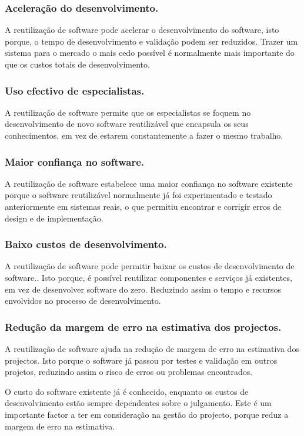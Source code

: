\documentclass[runningheads]{llncs}
\begin{document}
\subsubsection{Aceleração do desenvolvimento.}

A reutilização de software pode acelerar o desenvolvimento do software, isto porque, o tempo de desenvolvimento e validação podem ser reduzidos. Trazer um sistema para o mercado o mais cedo possível é normalmente mais importante do que os custos totais de desenvolvimento.

\subsubsection{Uso efectivo de especialistas.}

A reutilização de software permite que os especialistas se foquem no desenvolvimento de novo software reutilizável que encapsula os seus conhecimentos, em vez de estarem constantemente a fazer o mesmo trabalho.

\subsubsection{Maior confiança no software.}

A reutilização de software estabelece uma maior confiança no software existente porque o software reutilizável normalmente já foi experimentado e testado anteriormente em sistemas reais, o que permitiu encontrar e corrigir erros de design e de implementação.

\subsubsection{Baixo custos de desenvolvimento.}

A reutilização de software pode permitir baixar os custos de desenvolvimento de software.. Isto porque, é possível reutilizar componentes e serviços já existentes, em vez de desenvolver software do zero. Reduzindo assim o tempo e recursos envolvidos no processo de desenvolvimento.  


\subsubsection{Redução da margem de erro na estimativa dos projectos.}

A reutilização de software ajuda na redução de margem de erro na estimativa dos projectos. Isto porque o software já passou por testes e validação em outros projetos, reduzindo assim o risco de erros ou problemas encontrados.\par
O custo do software existente já é conhecido, enquanto os custos de desenvolvimento estão sempre dependentes sobre o julgamento. Este é um importante factor a ter em consideração na gestão do projecto, porque reduz a margem de erro na estimativa.
\end{document}
